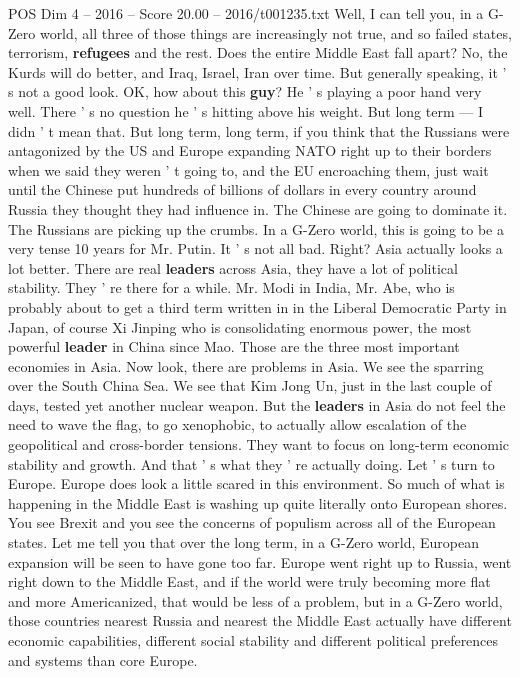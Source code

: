 \begin{textsample}{POS Dim 4 – 2016 – Score 20.00 – 2016/t001235.txt}
Well, I can tell you, in a G-Zero world, all three of those things are increasingly not true, and so failed states, terrorism, \textbf{refugees} and the rest.
Does the entire Middle East fall apart?
No, the Kurds will do better, and Iraq, Israel, Iran over time.
But generally speaking, it ' s not a good look.
OK, how about this \textbf{guy}?
He ' s playing a poor hand very well.
There ' s no question he ' s hitting above his weight.
But long term — I didn ' t mean that.
But long term, long term, if you think that the Russians were antagonized by the US and Europe expanding NATO right up to their borders when we said they weren ' t going to, and the EU encroaching them, just wait until the Chinese put hundreds of billions of dollars in every country around Russia they thought they had influence in.
The Chinese are going to dominate it.
The Russians are picking up the crumbs.
In a G-Zero world, this is going to be a very tense 10 years for Mr.
Putin.
It ' s not all bad.
Right?
Asia actually looks a lot better.
There are real \textbf{leaders} across Asia, they have a lot of political stability.
They ' re there for a while.
Mr.
Modi in India, Mr.
Abe, who is probably about to get a third term written in in the Liberal Democratic Party in Japan, of course Xi Jinping who is consolidating enormous power, the most powerful \textbf{leader} in China since Mao.
Those are the three most important economies in Asia.
Now look, there are problems in Asia.
We see the sparring over the South China Sea.
We see that Kim Jong Un, just in the last couple of days, tested yet another nuclear weapon.
But the \textbf{leaders} in Asia do not feel the need to wave the flag, to go xenophobic, to actually allow escalation of the geopolitical and cross-border tensions.
They want to focus on long-term economic stability and growth.
And that ' s what they ' re actually doing.
Let ' s turn to Europe.
Europe does look a little scared in this environment.
So much of what is happening in the Middle East is washing up quite literally onto European shores.
You see Brexit and you see the concerns of populism across all of the European states.
Let me tell you that over the long term, in a G-Zero world, European expansion will be seen to have gone too far.
Europe went right up to Russia, went right down to the Middle East, and if the world were truly becoming more flat and more Americanized, that would be less of a problem, but in a G-Zero world, those countries nearest Russia and nearest the Middle East actually have different economic capabilities, different social stability and different political preferences and systems than core Europe.

\end{textsample}
